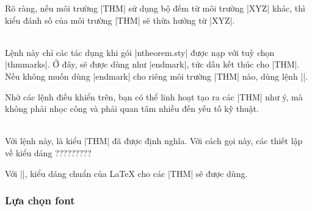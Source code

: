 \begin{description}
	Rõ ràng, nếu môi trường |THM| sử dụng bộ đếm từ môi trường |XYZ| khác,
	thì kiểu đánh số của môi trường |THM| sẽ thừa hưởng từ |XYZ|.
\item
\DescribeMacro\theoremsymbol
  \\
	Lệnh này chỉ các tác dụng khi gói |ntheorem.sty| được nạp với tuỳ chọn |thmmarks|.
	Ở đây,  sẽ được dùng như |endmark|, tức dấu kết thúc cho |THM|.
	Nếu không muốn dùng |endmark| cho riêng môi trường |THM| nào, 
	dùng lệnh |\theoremsymbol{}|.
\end{description}

Nhờ các lệnh điều khiển trên, bạn có thể linh hoạt tạo ra các |THM| như ý,
mà không phải nhọc công và phải quan tâm nhiều đến yếu tố kỹ thuật.

\medskip
\DescribeMacro\theoremclass{}\\
Với lệnh này,  là kiểu |THM| đã được định nghĩa.
Với cách gọi này, các thiết lập về kiểu dáng ?????????

Với ||, kiểu dáng chuẩn của \LaTeX{} cho các |THM|
sẽ được dùng.

\subsubsection{\texorpdfstring{Lựa chọn font}{Lua chon font}}

